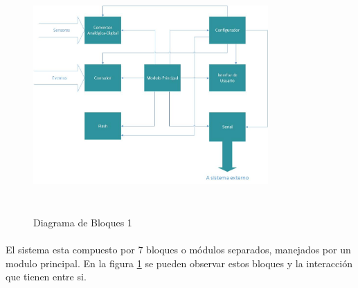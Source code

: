 \documentclass{article}
\theoremstyle{definition}
\theoremstyle{remark}
\begin{document}
\begin{figure}[h]
  \centering
  \includegraphics[width=0.80\textwidth, height = 9cm]{Bloques1}
  \caption{\small Diagrama de Bloques 1}\label{fig:bloques1}
\end{figure}

\paragraph{}
El sistema esta compuesto por 7 bloques o módulos separados, manejados por un modulo principal. En la figura \ref{fig:bloques1} se pueden observar estos bloques y la interacción que tienen entre si.
\paragraph{}
\end{document}
